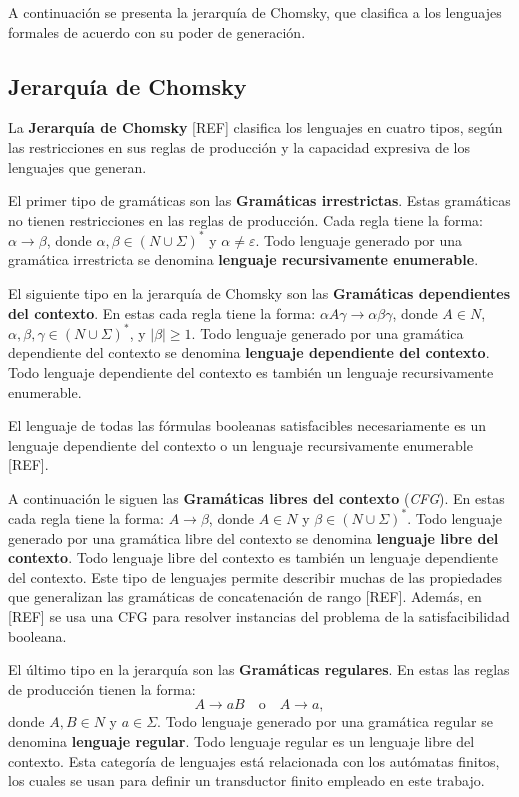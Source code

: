 \documentclass{report}
\theoremstyle{definition}
\theoremstyle{plain}
\theoremstyle{remark}
\begin{document}
A continuación se presenta la jerarquía de Chomsky, que clasifica a los
lenguajes formales de acuerdo con su poder de generación.

\subsection{Jerarquía de Chomsky}

La \textbf{Jerarquía de Chomsky} [REF] clasifica los lenguajes en cuatro
tipos, según las restricciones en sus reglas de producción y la capacidad
expresiva de los lenguajes que generan.

El primer tipo de gramáticas son las \textbf{Gramáticas irrestrictas}. Estas
gramáticas no tienen restricciones en las reglas de producción. Cada regla
tiene la forma: $\alpha \to \beta$, donde $\alpha, \beta \in (N \cup \Sigma)^*$
y $\alpha \neq \varepsilon$. Todo lenguaje generado por una gramática irrestricta
se denomina \textbf{lenguaje recursivamente enumerable}.

El siguiente tipo en la jerarquía de Chomsky son las \textbf{Gramáticas
dependientes del contexto}. En estas cada regla tiene la forma:
$\alpha A \gamma \to \alpha \beta \gamma$, donde $A \in N$,
$\alpha, \beta, \gamma \in (N \cup \Sigma)^*$, y $|\beta| \ge 1$. Todo lenguaje
generado por una gramática dependiente del contexto se denomina
\textbf{lenguaje dependiente del contexto}. Todo lenguaje dependiente del
contexto es también un lenguaje recursivamente enumerable.

El lenguaje de todas las fórmulas booleanas satisfacibles necesariamente es un
lenguaje dependiente del contexto o un lenguaje recursivamente enumerable [REF].

A continuación le siguen las \textbf{Gramáticas libres del contexto}
(\textit{CFG}). En estas cada regla tiene la forma: $A \to \beta$, donde
$A \in N$ y $\beta \in (N \cup \Sigma)^*$. Todo lenguaje generado por una
gramática libre del contexto se denomina \textbf{lenguaje libre del contexto}.
Todo lenguaje libre del contexto es también un lenguaje dependiente del contexto.
Este tipo de lenguajes permite describir muchas de las propiedades que
generalizan las gramáticas de concatenación de rango [REF]. Además, en [REF]
se usa una CFG para resolver instancias del problema de la satisfacibilidad
booleana.

El último tipo en la jerarquía son las \textbf{Gramáticas regulares}. En estas
las reglas de producción tienen la forma:
\[
  A \to aB \quad \text{o} \quad A \to a,
\]
donde $A, B \in N$ y $a \in \Sigma$. Todo lenguaje generado por una gramática
regular se denomina \textbf{lenguaje regular}. Todo lenguaje regular es un
lenguaje libre del contexto. Esta categoría de lenguajes está relacionada con
los autómatas finitos, los cuales se usan para definir un transductor finito
empleado en este trabajo.
\end{document}
